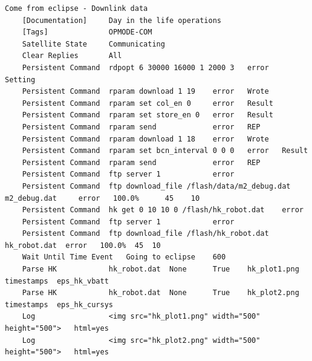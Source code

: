 \documentclass[english,12pt,a4paper,pdftex,elec,utf8]{aaltothesis}
\begin{document}
\begin{verbatim}
Come from eclipse - Downlink data
    [Documentation]     Day in the life operations
    [Tags]              OPMODE-COM
    Satellite State     Communicating
    Clear Replies       All
    Persistent Command  rdpopt 6 30000 16000 1 2000 3   error   Setting
    Persistent Command  rparam download 1 19    error   Wrote
    Persistent Command  rparam set col_en 0     error   Result
    Persistent Command  rparam set store_en 0   error   Result
    Persistent Command  rparam send             error   REP
    Persistent Command  rparam download 1 18    error   Wrote
    Persistent Command  rparam set bcn_interval 0 0 0   error   Result
    Persistent Command  rparam send             error   REP
    Persistent Command  ftp server 1            error
    Persistent Command  ftp download_file /flash/data/m2_debug.dat m2_debug.dat     error   100.0%      45    10
    Persistent Command  hk get 0 10 10 0 /flash/hk_robot.dat    error
    Persistent Command  ftp server 1            error
    Persistent Command  ftp download_file /flash/hk_robot.dat hk_robot.dat  error   100.0%  45  10
    Wait Until Time Event   Going to eclipse    600
    Parse HK            hk_robot.dat  None      True    hk_plot1.png    timestamps  eps_hk_vbatt
    Parse HK            hk_robot.dat  None      True    hk_plot2.png    timestamps  eps_hk_cursys
    Log                 <img src="hk_plot1.png" width="500" height="500">   html=yes
    Log                 <img src="hk_plot2.png" width="500" height="500">   html=yes
\end{verbatim}
\clearpage
\end{document}
